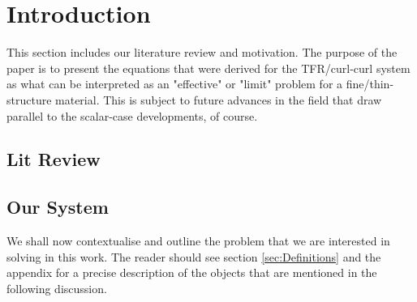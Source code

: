 \section{Introduction} \label{sec:Intro}

This section includes our literature review and motivation.
The purpose of the paper is to present the equations that were derived for the TFR/curl-curl system as what can be interpreted as an "effective" or "limit" problem for a fine/thin-structure material.
This is subject to future advances in the field that draw parallel to the scalar-case developments, of course.

\subsection{Lit Review} \label{ssec:LitReview}

\subsection{Our System} \label{ssec:OurSystem}

We shall now contextualise and outline the problem that we are interested in solving in this work.
The reader should see section \ref{sec:Definitions} and the appendix  for a precise description of the objects that are mentioned in the following discussion. \newline

